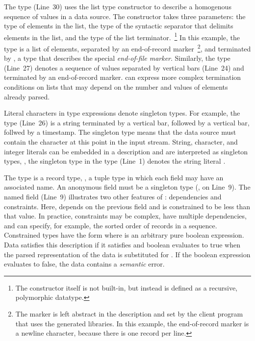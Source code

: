 The type  (Line~30) uses the list type
constructor  to describe a homogenous sequence of
values in a data source.  The  constructor 
takes three parameters: the type of elements in the list, 
the type of the syntactic separator that delimits elements in the list,
and the type of the list terminator.~\footnote{The  
constructor itself is not built-in, but instead 
is defined as a recursive, polymorphic datatype.} 
In this example, the type  is a list 
of  elements, separated by an
end-of-record  marker~\footnote{%
  The marker is left abstract in the description and set by the client program
  that uses the generated libraries.
  In this example, the end-of-record marker is a newline 
  character, because there is one record per line.  
}, 
and terminated by , a 
type that describes the special \emph{end-of-file marker}.  
Similarly, the  type (Line~27)
denotes a sequence of  values separated by vertical bars
(Line~24) and terminated by an end-of-record marker.  
\padsml{} can express more complex termination
conditions on lists that may depend on 
the number and values of elements already parsed.

Literal characters in type expressions denote singleton types.  For
example, the  type (Line~26) is a string terminated by a
vertical bar, followed by a vertical bar, follwed by a timestamp.  The
singleton type  means that the data source must contain the
character  at this point in the input stream.  String,
character, and integer literals can be embedded in a description and
are interpreted as singleton types, \eg{}, the singleton type
 in the  type (Line~1) 
denotes the string literal .

The type  is a record type, \ie{}, a tuple type in
which each field may have an associated name.  An anonymous field must
be a singleton type (\eg{},  on Line~9).  The named field
 (Line~9) illustrates two other features of
\padsml: dependencies and constraints.  Here, 
depends on the previous field  and is constrained to be
less than that value.  In practice, constraints may be complex, have
multiple dependencies, and can specify, for example, the sorted order
of records in a sequence.  Constrained types have the form \cd{[x:T |
e]} where  is an arbitrary pure boolean expression.  Data
satisfies this description if it satisfies  and boolean 
evaluates to true when the parsed representation of the data is
substituted for .  If the boolean expression evaluates to false,
the data contains a \textit{semantic} error.

